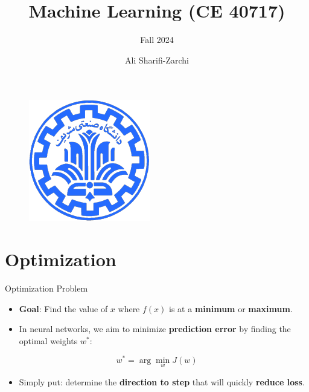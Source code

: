\documentclass[serif, aspectratio=169]{beamer}
\author{Ali Sharifi-Zarchi}
\title{Machine Learning (CE 40717)}
\subtitle{Fall 2024}
\institute{
    CE Department \\
    Sharif University of Technology
}
\begin{document}
\begin{frame}
    \titlepage
    \vspace*{-0.6cm}
    \begin{figure}[htpb]
        \begin{center}
            \includegraphics[keepaspectratio, scale=0.25]{pic/sharif-main-logo.png}
        \end{center}
    \end{figure}
\end{frame}

\begin{frame}    
\tableofcontents[sectionstyle=show,
subsectionstyle=show/shaded/hide,
subsubsectionstyle=show/shaded/hide]
\end{frame}

\section{Optimization}

\begin{frame}{Optimization Problem}
    \begin{itemize}
        \item \textbf{Goal}: Find the value of $x$ where $f(x)$ is at a \textbf{minimum} or \textbf{maximum}.
        \item In neural networks, we aim to minimize \textbf{prediction error} by finding the optimal weights $w^*$:
    \end{itemize}
    
    \[
    w^* = \arg\min_{w} J(w)
    \]
    
    \begin{itemize}
        \item Simply put: determine the \textbf{direction to step} that will quickly \textbf{reduce loss}.
    \end{itemize}
    
\end{frame}
\end{document}
